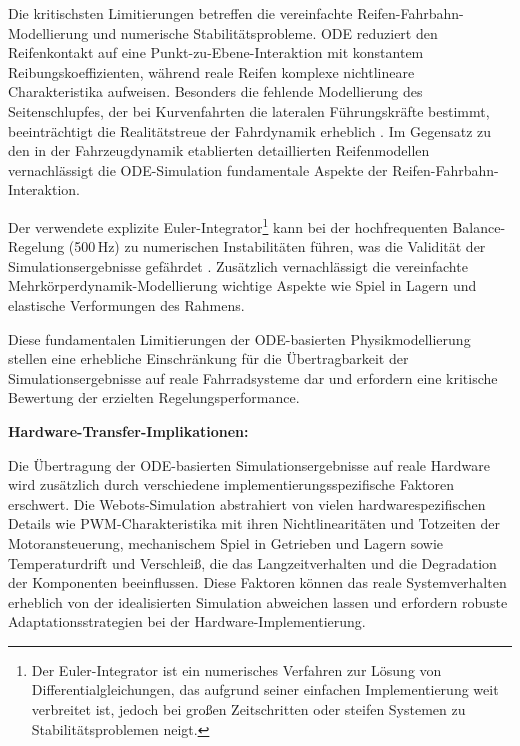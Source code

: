 Die kritischsten Limitierungen betreffen die vereinfachte Reifen-Fahrbahn-Modellierung und numerische Stabilitätsprobleme. ODE reduziert 
den Reifenkontakt auf eine Punkt-zu-Ebene-Interaktion mit konstantem Reibungskoeffizienten, während reale Reifen komplexe nichtlineare 
Charakteristika aufweisen. Besonders die fehlende Modellierung des Seitenschlupfes, der bei Kurvenfahrten die lateralen Führungskräfte 
bestimmt, beeinträchtigt die Realitätstreue der Fahrdynamik erheblich \citep{catto2009ode_friction}. Im Gegensatz zu den in der 
Fahrzeugdynamik etablierten detaillierten Reifenmodellen \citep{schramm2018fahrzeugdynamik} vernachlässigt die ODE-Simulation 
fundamentale Aspekte der Reifen-Fahrbahn-Interaktion.

Der verwendete explizite Euler-Integrator\footnote{Der Euler-Integrator ist ein numerisches Verfahren zur Lösung von Differentialgleichungen, das aufgrund seiner einfachen Implementierung weit verbreitet ist, jedoch bei großen Zeitschritten oder steifen Systemen zu Stabilitätsproblemen neigt.} kann bei der hochfrequenten Balance-Regelung (500\,Hz) zu numerischen Instabilitäten führen, 
was die Validität der Simulationsergebnisse gefährdet \citep{smith2006ode_stability}. Zusätzlich vernachlässigt die vereinfachte 
Mehrkörperdynamik-Modellierung wichtige Aspekte wie Spiel in Lagern und elastische Verformungen des Rahmens.

Diese fundamentalen Limitierungen der ODE-basierten Physikmodellierung stellen eine erhebliche Einschränkung für die Übertragbarkeit der 
Simulationsergebnisse auf reale Fahrradsysteme dar und erfordern eine kritische Bewertung der erzielten Regelungsperformance.

\textbf{Hardware-Transfer-Implikationen:}

Die Übertragung der ODE-basierten Simulationsergebnisse auf reale Hardware wird zusätzlich durch verschiedene implementierungsspezifische 
Faktoren erschwert. Die Webots-Simulation abstrahiert von vielen hardwarespezifischen Details wie PWM-Charakteristika mit ihren 
Nichtlinearitäten und Totzeiten der Motoransteuerung, mechanischem Spiel in Getrieben und Lagern sowie Temperaturdrift und Verschleiß, 
die das Langzeitverhalten und die Degradation der Komponenten beeinflussen. Diese Faktoren können das reale Systemverhalten erheblich 
von der idealisierten Simulation abweichen lassen und erfordern robuste Adaptationsstrategien bei der Hardware-Implementierung.



